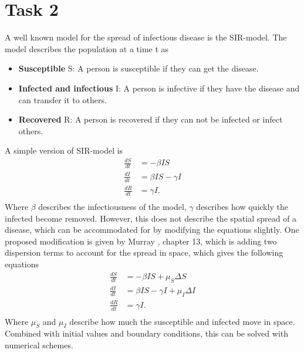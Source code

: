 \section{Task 2}

A well known model for the spread of infectious disease is the SIR-model. The model describes the population at a time t as 
\begin{itemize}
    \item \textbf{Susceptible} S: A person is susceptible if they can get the disease.
    \item \textbf{Infected and infectious} I: A person is infective if they have the disease and can transfer it to others.
    \item \textbf{Recovered} R: A person is recovered if they can not be infected or infect others.
\end{itemize}

A simple version of SIR-model is
\begin{equation}
    \begin{split}
        \frac{dS}{dt} &= -\beta I S \\
        \frac{dI}{dt} &= \beta IS - \gamma I \\
        \frac{dR}{dt} &= \gamma I. \\
    \end{split}
\end{equation}
Where $\beta$ describes the infectiousness of the model, $\gamma$ describes how quickly the infected become removed.
However, this does not describe the spatial spread of a disease, which can be accommodated for by modifying the equations slightly. One proposed modification is given by Murray \cite{bok}, chapter 13, which is adding
two dispersion terms to account for the spread in space, which gives the following equations
\begin{equation}
    \label{eq:super_sir}
    \begin{split}
        \frac{dS}{dt} &= -\beta I S + \mu_S \Delta S \\
        \frac{dI}{dt} &= \beta IS - \gamma I + \mu_I \Delta I\\
        \frac{dR}{dt} &= \gamma I. \\
    \end{split}
\end{equation}
Where $\mu_S$ and $\mu_I$ describe how much the susceptible and infected move in space. 
Combined with initial values and boundary conditions, this can be solved with numerical schemes.

